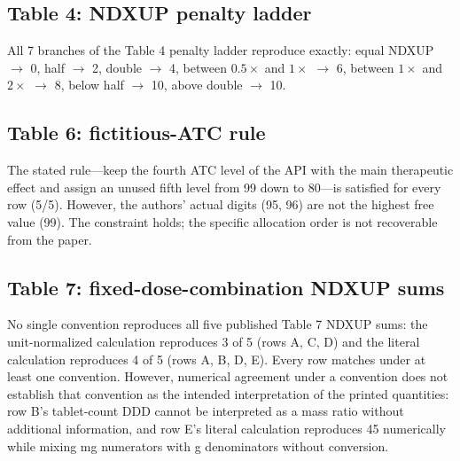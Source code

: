 \documentclass[a4paper]{elsarticle}
\begin{document}
\subsection{Table 4: NDXUP penalty ladder}
\label{sec:results-table4}

All 7 branches of the Table 4 penalty ladder reproduce exactly: equal NDXUP $\to$ 0, half $\to$ 2, double $\to$ 4, between $0.5\times$ and $1\times$ $\to$ 6, between $1\times$ and $2\times$ $\to$ 8, below half $\to$ 10, above double $\to$ 10.

\subsection{Table 6: fictitious-ATC rule}
\label{sec:results-table6}

The stated rule---keep the fourth ATC level of the API with the main therapeutic effect and assign an unused fifth level from 99 down to 80---is satisfied for every row (5/5). However, the authors' actual digits (95, 96) are not the highest free value (99). The constraint holds; the specific allocation order is not recoverable from the paper.

\subsection{Table 7: fixed-dose-combination NDXUP sums}
\label{sec:results-table7}

\begin{table}[htbp]
\centering\small
\caption{Reproduction of the 5 published Table 7 NDXUP sums under two unit conventions. A row counts as reproduced when \emph{some} convention matches.}
\label{tab:table7}
\end{table}

No single convention reproduces all five published Table 7 NDXUP sums: the unit-normalized calculation reproduces 3 of 5 (rows A, C, D) and the literal calculation reproduces 4 of 5 (rows A, B, D, E). Every row matches under at least one convention. However, numerical agreement under a convention does not establish that convention as the intended interpretation of the printed quantities: row B's tablet-count DDD cannot be interpreted as a mass ratio without additional information, and row E's literal calculation reproduces 45 numerically while mixing mg numerators with g denominators without conversion.
\end{document}
